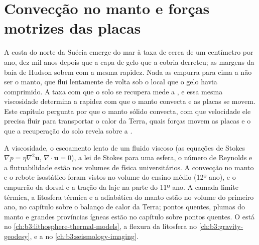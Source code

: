 \chapter{Convecção no manto e forças motrizes das placas}\label{ch:b3:mantle-convection}

A costa do norte da Suécia emerge do mar à taxa de cerca de um centímetro por
ano, dez mil anos depois que a capa de gelo que a cobria derreteu; as
margens da baía de Hudson sobem com a mesma rapidez. Nada as empurra para
cima a não ser o manto, que flui lentamente de volta sob o local que o gelo
havia comprimido. A taxa com que o solo se recupera mede a ,
e essa mesma viscosidade determina a rapidez com que o manto convecta e as
placas se movem. Este capítulo pergunta por que o manto sólido convecta, com
que velocidade ele precisa fluir para transportar o calor da Terra, quais forças
movem as placas e o que a recuperação do solo revela sobre a .

\begin{recall}
A viscosidade, o escoamento lento de um fluido viscoso (as equações de Stokes
$\nabla p = \eta\nabla^2\mathbf u$, $\nabla\cdot\mathbf u = 0$), a lei de Stokes
para uma esfera, o número de Reynolds e a flutuabilidade estão nos volumes de
física universitários. A convecção no manto e o rebote isostático foram
vistos no volume do ensino médio (12º ano), e o empurrão da dorsal e a tração da laje na parte do 11º ano.
A camada limite térmica, a litosfera térmica e a adiabática do manto estão no
volume do primeiro ano, no capítulo sobre o balanço de calor da Terra; pontos
quentes, plumas do manto e grandes províncias ígneas estão no capítulo sobre
pontos quentes. O  está no \cref{ch:b3:lithosphere-thermal-models},
a flexura da litosfera no \cref{ch:b3:gravity-geodesy}, e a
 no \cref{ch:b3:seismology-imaging}.
\end{recall}

